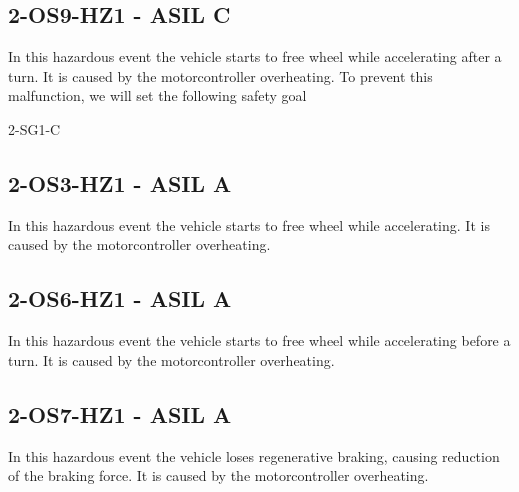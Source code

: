 \subsection{2-OS9-HZ1 - ASIL C}
In this hazardous event the vehicle starts to free wheel while accelerating after a turn.
It is caused by the motorcontroller overheating.
To prevent this malfunction, we will set the following safety goal
\begin{description}
    \item[2-SG1-C] 
\end{description}

\subsection{2-OS3-HZ1 - ASIL A}
In this hazardous event the vehicle starts to free wheel while accelerating.
It is caused by the motorcontroller overheating.

\subsection{2-OS6-HZ1 - ASIL A}
In this hazardous event the vehicle starts to free wheel while accelerating before a turn.
It is caused by the motorcontroller overheating.

\subsection{2-OS7-HZ1 - ASIL A}
In this hazardous event the vehicle loses regenerative braking, causing reduction of the braking force.
It is caused by the motorcontroller overheating.
